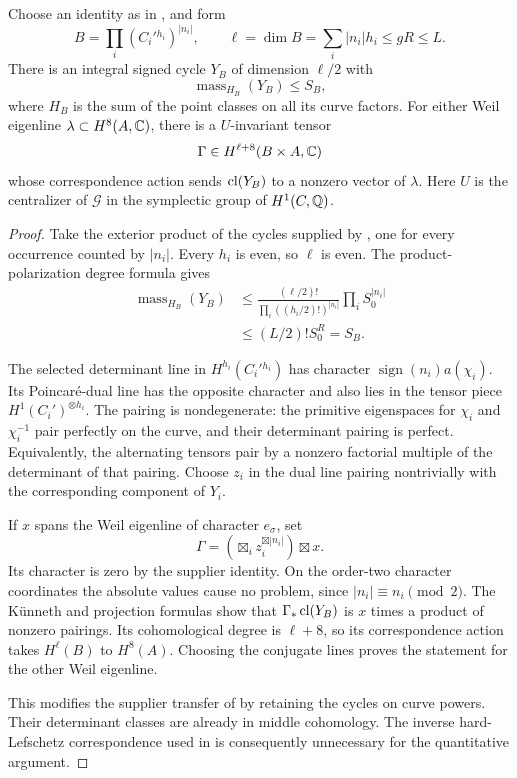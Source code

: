 \begin{proposition}\label{SQ5}
Choose an identity as in , and form
\[
 B=\prod_i(C_i'{}^{h_i})^{|n_i|},\qquad
 \ell=\dim B=\sum_i|n_i|h_i\le gR\le L.
\]
There is an integral signed cycle $Y_B$ of dimension $\ell/2$ with
\[
 \operatorname{mass}_{H_B}(Y_B)\le S_B,
\]
where $H_B$ is the sum of the point classes on all its curve factors. For either Weil eigenline $\lambda\subset H^8(A,\mathbb C)$, there is a $U$-invariant tensor
\[
 \Gamma\in H^{\ell+8}(B\times A,\mathbb C)
\]
whose correspondence action sends $\operatorname{cl}(Y_B)$ to a nonzero vector of $\lambda$. Here $U$ is the centralizer of $\mathcal G$ in the symplectic group of $H^1(C,\mathbb Q)$.
\end{proposition}
\begin{proof}
Take the exterior product of the cycles supplied by , one for every occurrence counted by $|n_i|$. Every $h_i$ is even, so $\ell$ is even. The product-polarization degree formula gives
\begin{align*}
 \operatorname{mass}_{H_B}(Y_B)
 &\le\frac{(\ell/2)!}{\prod_i((h_i/2)!)^{|n_i|}}
       \prod_iS_0^{|n_i|}\\
 &\le(L/2)!S_0^R=S_B.
\end{align*}

The selected determinant line in $H^{h_i}(C_i'{}^{h_i})$ has character $\operatorname{sign}(n_i)a(\chi_i)$. Its Poincar\'e-dual line has the opposite character and also lies in the tensor piece $H^1(C_i')^{\otimes h_i}$. The pairing is nondegenerate: the primitive eigenspaces for $\chi_i$ and $\chi_i^{-1}$ pair perfectly on the curve, and their determinant pairing is perfect. Equivalently, the alternating tensors pair by a nonzero factorial multiple of the determinant of that pairing. Choose $z_i$ in the dual line pairing nontrivially with the corresponding component of $Y_i$.

If $x$ spans the Weil eigenline of character $e_\sigma$, set
\[
 \Gamma=\left(\mathop{\boxtimes}_i
                   z_i^{\boxtimes|n_i|}\right)\boxtimes x.
\]
Its character is zero by the supplier identity. On the order-two character coordinates the absolute values cause no problem, since $|n_i|\equiv n_i\pmod2$. The K\"unneth and projection formulas show that $\Gamma_*\operatorname{cl}(Y_B)$ is $x$ times a product of nonzero pairings. Its cohomological degree is $\ell+8$, so its correspondence action takes $H^\ell(B)$ to $H^8(A)$. Choosing the conjugate lines proves the statement for the other Weil eigenline.

This modifies the supplier transfer of \citet[Proposition \texttt{prop:supply}]{Severn26} by retaining the cycles on curve powers. Their determinant classes are already in middle cohomology. The inverse hard-Lefschetz correspondence used in \citet[Corollary~3.1, p.~25]{Schoen88} is consequently unnecessary for the quantitative argument.
\end{proof}

